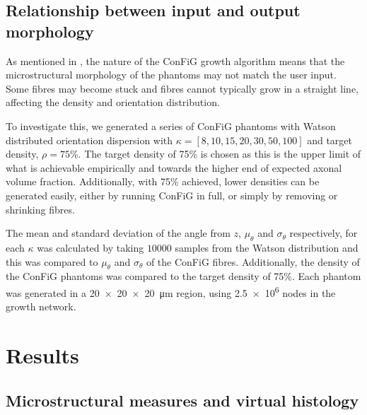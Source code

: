 \subsection{Relationship between input and output morphology}
\label{sec:config_input_output_rel}
As mentioned in , the nature of the ConFiG growth algorithm means that the microstructural morphology of the phantoms may not match the user input. Some fibres may become stuck and fibres cannot typically grow in a straight line, affecting the density and orientation distribution.

To investigate this, we generated a series of ConFiG phantoms with Watson distributed orientation dispersion with $\kappa=[8,10,15,20,30,50,100]$ and target density, $\rho = 75$\%. The target density of 75\% is chosen as this is the upper limit of what is achievable empirically and towards the higher end of expected axonal volume fraction. Additionally, with 75\% achieved, lower densities can be generated easily, either by running ConFiG in full, or simply by removing or shrinking fibres.

The mean and standard deviation of the angle from $z$, $\mu_\theta$ and $\sigma_\theta$ respectively, for each $\kappa$ was calculated by taking $10000$ samples from the Watson distribution and this was compared to $\mu_\theta$ and $\sigma_\theta$ of the ConFiG fibres. Additionally, the density of the ConFiG phantoms was compared to the target density of 75\%. Each phantom was generated in a \SI{20 x 20 x 20}{\micro\metre} region, using \num{2.5e6} nodes in the growth network.

\section{Results}
\label{sec:micro_results}

\subsection{Microstructural measures and virtual histology}
\label{sec:config_result_micro_meas}


